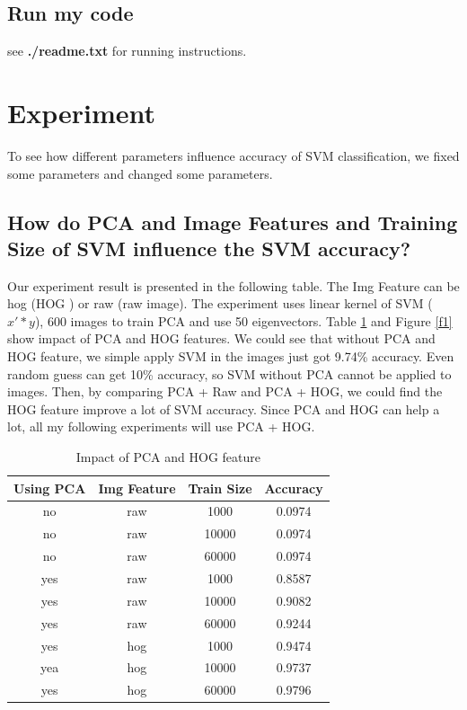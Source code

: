 \documentclass[10pt,twocolumn,letterpaper]{article}
\begin{document}
\subsection{Run my code}
see \textbf{./readme.txt} for running instructions. 

\section{Experiment}
To see how different parameters influence accuracy of SVM classification, we fixed some parameters and changed some parameters.

\subsection{How do PCA and Image Features and Training Size of SVM influence the SVM accuracy?}
Our experiment result is presented in the following table. The Img Feature can be hog (HOG \cite{dalal2005histograms}) or raw (raw image). The experiment uses linear kernel of SVM ($x' * y$), 600 images to train PCA and use 50 eigenvectors. Table \ref{t1} and Figure \ref{f1} show impact of PCA and HOG features. We could see that without PCA and HOG feature, we simple apply SVM in the images just got 9.74\% accuracy. Even random guess can get 10\% accuracy, so SVM without PCA cannot be applied to images. Then, by comparing PCA + Raw and PCA + HOG, we could find the HOG feature improve a lot of SVM accuracy. Since PCA and HOG can help a lot, all my following experiments will use PCA + HOG.
\begin{table}

    \begin{tabular}{|c|c|c|c|}
      \hline
      Using PCA & Img Feature & Train Size & Accuracy \\
      \hline
      no & raw & 1000 & 0.0974 \\
      no & raw & 10000 & 0.0974 \\
      no & raw & 60000 & 0.0974 \\
      \hline
      yes & raw & 1000 & 0.8587 \\
      yes & raw & 10000 & 0.9082 \\
      yes & raw & 60000 & 0.9244 \\
      \hline
      yes & hog & 1000 & 0.9474 \\
      yea & hog & 10000 & 0.9737 \\
      yes & hog & 60000 & 0.9796 \\
      \hline
    \end{tabular}
    \caption{Impact of PCA and HOG feature}
    \label{t1}
\end{table}
\end{document}
